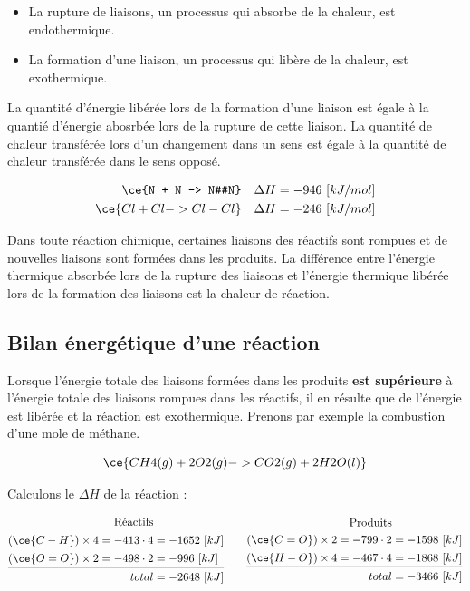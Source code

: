 \documentclass[
  11pt,
  french,
  a4paper,
  openany]{book}
\providecommand{\tightlist}{%
  \setlength{\itemsep}{0pt}\setlength{\parskip}{0pt}}
\begin{document}
\begin{itemize}
\tightlist
\item
  La rupture de liaisons, un processus qui absorbe de la chaleur, est endothermique.
\item
  La formation d'une liaison, un processus qui libère de la chaleur, est exothermique.
\end{itemize}

La quantité d'énergie libérée lors de la formation d'une liaison est égale à la quantié d'énergie abosrbée lors de la rupture de cette liaison. La quantité de chaleur transférée lors d'un changement dans un sens est égale à la quantité de chaleur transférée dans le sens opposé.

\[
\begin{split}
\ce{N + N -> N#N} \quad \Delta H = -946\ [kJ/mol] \\ 
\ce{Cl + Cl -> Cl-Cl} \quad \Delta H = -246\ [kJ/mol]
\end{split}
\]

Dans toute réaction chimique, certaines liaisons des réactifs sont rompues et de nouvelles liaisons sont formées dans les produits. La différence entre l'énergie thermique absorbée lors de la rupture des liaisons et l'énergie thermique libérée lors de la formation des liaisons est la chaleur de réaction.

\clearpage

\hypertarget{bilan-uxe9nerguxe9tique-dune-ruxe9action}{%
\subsection{Bilan énergétique d'une réaction}\label{bilan-uxe9nerguxe9tique-dune-ruxe9action}}

Lorsque l'énergie totale des liaisons formées dans les produits \textbf{est supérieure} à l'énergie totale des liaisons rompues dans les réactifs, il en résulte que de l'énergie est libérée et la réaction est exothermique. Prenons par exemple la combustion d'une mole de méthane.

\[
\ce{CH4(g) + 2 O2(g) -> CO2(g) + 2 H2O(l)}
\]

Calculons le \(\Delta H\) de la réaction :

\[
\begin{split}
  \text{Réactifs}& \\[0.1em]
  (\ce{C-H}) \times 4 = -413 \cdot 4 &= -1652\ [kJ] \\[0.1em]
  (\ce{O=O}) \times 2 = -498 \cdot 2 &= -996\ [kJ] \\[0.1em]
  \hline\\[-1.2em]
  total &= -2648\ [kJ]
\end{split}
\qquad
\begin{split}
  \text{Produits}& \\
  (\ce{C=O}) \times 2 = -799 \cdot 2 &= -1598\ [kJ] \\[0.1em]
  (\ce{H-O}) \times 4 = -467 \cdot 4 &= -1868\ [kJ] \\[0.1em]
  \hline\\[-1.2em]
  total &= -3466\ [kJ]
\end{split}
\]
\end{document}
